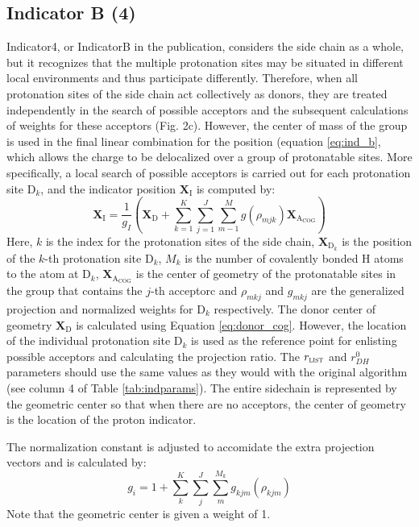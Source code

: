 \documentclass{article}
\newcommand{\mb}[1]{\mathbf{#1}}
\newcommand{\mr}[1]{\mathrm{#1}}
\begin{document}
\subsection{Indicator B (4)}\label{ss:ind_b}
Indicator4, or IndicatorB in the publication, considers the side chain as a whole, but it recognizes that the multiple protonation sites may be situated in different local environments and thus participate differently.
Therefore, when all protonation sites of the side chain act collectively as donors, they are treated independently in the search of possible acceptors and the subsequent calculations of weights for these acceptors (Fig. 2c).
However, the center of mass of the group is used in the final linear combination for the position (equation \ref{eq:ind_b}, which allows the charge to be delocalized over a group of protonatable sites.
More specifically, a local search of possible acceptors is carried out for each protonation site $\mr{D}_k$, and the indicator position $\mb{X}_\mr{I}$ is computed by:
\begin{equation}\label{eq:ind_b}
\mathbf{X}_\mr{I} = \frac{1}{g_I} \left( \mathbf{X}_\mr{D} + \sum^K_{k=1} \sum^J_{j=1}   \sum^M_{m-1} g(\rho_{mjk}) \mathbf{X}_{\mr{A}_{\mr{COG}}}  \right) 
\end{equation}
Here, $k$ is the index for the protonation sites of the side chain, $\mathbf{X}_{\mr{D}_k}$ is the position of the $k$-th protonation site $\mr{D}_k$, $M_k$ is the number of covalently bonded H atoms to the atom at $\mr{D}_k$, $\mathbf{X}_{\mr{A}_{\mr{COG}}}$ is the center of geometry of the protonatable sites in the group that contains the $j$-th acceptorc  and $\rho_{mkj}$ and $g_{mkj}$ are the generalized projection and normalized weights for $\mr{D}_k$ respectively. 
The donor center of geometry $\mathbf{X}_\mr{D}$ is calculated using Equation \ref{eq:donor_cog}.
However, the location of the individual protonation site $\mr{D}_k$ is used as the reference point for enlisting possible acceptors and calculating the projection ratio.
The $r_\mathrm{\textsc{list}}$ and $r^0_{DH}$ parameters should use the same values as they would with the original algorithm (see column 4 of Table \ref{tab:indparams}).
The entire sidechain is represented by the geometric center so that when there are no acceptors, the center of geometry is the location of the proton indicator.

The normalization constant is adjusted to accomidate the extra projection vectors and is calculated by:
\begin{equation}\label{eq:ind_b-normalization}
g_i = 1 + \sum_k^K \sum_j^J \sum_m^{M_k} g_{kjm}(\rho_{kjm})
\end{equation}
Note that the geometric center is given a weight of 1.
\end{document}
